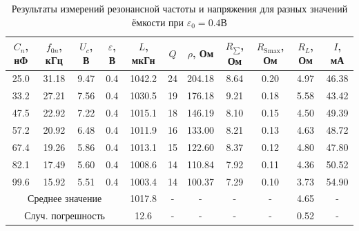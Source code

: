 \begin{table}[h!]
    \centering
    \begin{tabular}{|c|c|c|c|c|c|c|c|c|c|c|}
        \hline
        $C_n$, нФ & $f_{0n}$, кГц & $U_c$, В & $\varepsilon$, В & $L$, мкГн & $Q$ & $\rho$, Ом & $R_{\sum}$, Ом & $R_{\text{Smax}}$, Ом & $R_L$, Ом & $I$, мА\\\hline
        25.0 & 31.18 & 9.47 & 0.4 & 1042.2& 24 & 204.18 & 8.64  & 0.20 & 4.97 & 46.38 \\\hline          
        33.2 & 27.21 & 7.56 & 0.4 & 1030.5& 19 & 176.18 & 9.21  & 0.18 & 5.58 & 43.42 \\\hline
        47.5 & 22.92 & 7.22 & 0.4 & 1015.1& 18 & 146.19 & 8.10  & 0.15 & 4.50 & 49.39 \\\hline
        57.2 & 20.92 & 6.48 & 0.4 & 1011.9& 16 & 133.00 & 8.21  & 0.13 & 4.63 & 48.72 \\\hline      
        67.4 & 19.26 & 5.86 & 0.4 & 1013.1& 15 & 122.60 & 8.37  & 0.12 & 4.80 & 47.80 \\\hline
        82.1 & 17.49 & 5.60 & 0.4 & 1008.6& 14 & 110.84 & 7.92  & 0.11 & 4.36 & 50.52 \\\hline
        99.6 & 15.92 & 5.51 & 0.4 & 1003.4& 14 & 100.37 & 7.29  & 0.10 & 3.73 & 54.90 \\\hline
        \multicolumn{4}{|c|}{Среднее значение}  & 1017.8 & - & - & - & - & 4.65 & -       \\\hline
        \multicolumn{4}{|c|}{Случ. погрешность} & 12.6   & - & - & - & - & 0.52 & -      \\\hline
    \end{tabular}
    \caption{Результаты измерений резонансной частоты и напряжения для разных значений ёмкости при $\varepsilon_0 = 0.4$В}
\end{table}

